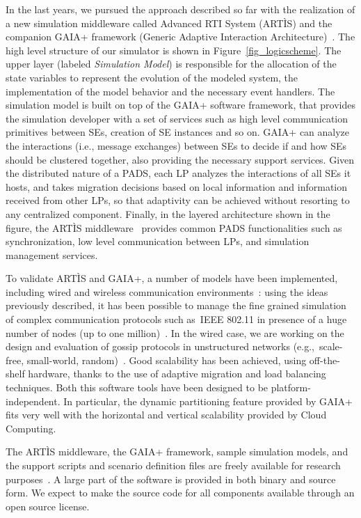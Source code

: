 \documentclass[1p]{elsarticle}
\begin{document}
In the last years, we pursued the approach described so far with the
realization of a new simulation middleware called Advanced RTI System
(ART\`IS) and the companion GAIA+ framework (Generic Adaptive
Interaction
Architecture)~\cite{gda-ijspm-2009,gda-dsrt-2004,gda-pads-2003}. The
high level structure of our simulator is shown in
Figure~\ref{fig_logicscheme}. The upper layer (labeled
\emph{Simulation Model}) is responsible for the allocation of the
state variables to represent the evolution of the modeled system, the
implementation of the model behavior and the necessary event
handlers. The simulation model is built on top of the GAIA+ software
framework, that provides the simulation developer with a set of
services such as high level communication primitives between SEs,
creation of SE instances and so on. GAIA+ can analyze the interactions
(i.e., message exchanges) between SEs to decide if and how SEs should
be clustered together, also providing the necessary support
services. Given the distributed nature of a PADS, each LP analyzes the
interactions of all SEs it hosts, and takes migration decisions based
on local information and information received from other LPs, so that
adaptivity can be achieved without resorting to any centralized
component. Finally, in the layered architecture shown in the figure,
the ART\`IS middleware~\cite{pads} provides common PADS
functionalities such as synchronization, low level communication
between LPs, and simulation management services.

To validate ART\`IS and GAIA+, a number of models have been
implemented, including wired and wireless communication
environments~\cite{gda-simutools-09,moves}: using the ideas previously
described, it has been possible to manage the fine grained simulation
of complex communication protocols such as~IEEE 802.11 in presence of
a huge number of nodes (up to one million)~\cite{gda-ijspm-2009}. In
the wired case, we are working on the design and evaluation of gossip
protocols in unstructured networks (e.g.,~scale-free, small-world,
random)~\cite{gda-disio-10,gda-disio-11}. Good scalability has been
achieved, using off-the-shelf hardware, thanks to the use of adaptive
migration and load balancing techniques. Both this software tools have
been designed to be platform-independent. In particular, the dynamic
partitioning feature provided by GAIA+ fits very well with the
horizontal and vertical scalability provided by Cloud Computing.

The ART\`IS middleware, the GAIA+ framework, sample simulation models,
and the support scripts and scenario definition files are freely
available for research purposes~\cite{pads}. A large part of the
software is provided in both binary and source form. We expect to make
the source code for all components available through an open source
license.
\end{document}
